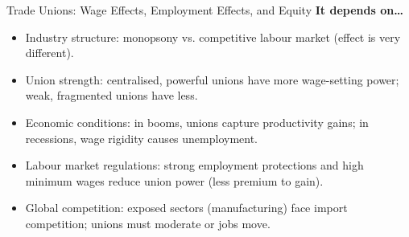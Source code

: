 \documentclass[11pt, a4paper, twoside]{book}
\begin{document}
\begin{evaluation}{Trade Unions: Wage Effects, Employment Effects, and Equity}
\textbf{It depends on\ldots}
\begin{itemize}[leftmargin=*, nosep]
\item Industry structure: monopsony vs. competitive labour market (effect is very different).
\item Union strength: centralised, powerful unions have more wage-setting power; weak, fragmented unions have less.
\item Economic conditions: in booms, unions capture productivity gains; in recessions, wage rigidity causes unemployment.
\item Labour market regulations: strong employment protections and high minimum wages reduce union power (less premium to gain).
\item Global competition: exposed sectors (manufacturing) face import competition; unions must moderate or jobs move.
\end{itemize}
\end{evaluation}
\end{document}
